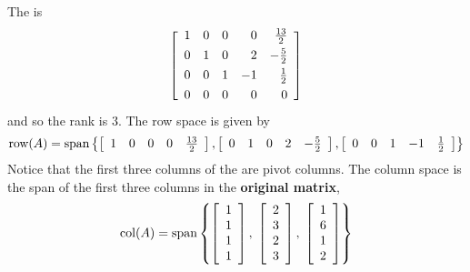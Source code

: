 \begin{solution}
The {\rref} is 
\begin{equation*}
\leftB 
\begin{array}{rrrrrr}
1 & 0 & 0 & 0 & \vspace{0.05in}\frac{13}{2} \\ 
0 & 1 & 0 & 2 & -\vspace{0.05in}\frac{5}{2} \\ 
0 & 0 & 1 & -1 & \vspace{0.05in}\frac{1}{2} \\ 
0 & 0 & 0 & 0 & 0
\end{array}
\rightB 
\end{equation*}
and so the rank is $3$. The row space is given by 
\begin{equation*}
\mbox{row}(A) = \mbox{span} \left\{ 
\left[ 
\begin{array}{ccccc}
1 & 0 & 0 & 0 & \frac{13}{2}
\end{array}
\right],
\left[ 
\begin{array}{rrrrr}
0 & 1 & 0 & 2 & -\frac{5}{2}
\end{array}
\right] , 
\left[ 
\begin{array}{rrrrr}
0 & 0 & 1 & -1 & \frac{1}{2}
\end{array}
\right]
 \right\}
\end{equation*}
Notice that the first three columns of the {\rref} are pivot columns. The column space is the span of the first three columns in the \textbf{original matrix}, 
\begin{equation*}
\mbox{col}(A) = \mbox{span} \left\{ \left[ 
\begin{array}{r}
1 \\ 
1 \\ 
1 \\ 
1
\end{array}
\right], \; \left[ 
\begin{array}{r}
2 \\ 
3 \\ 
2 \\ 
3
\end{array}
\right] , \; \left[ 
\begin{array}{r}
1 \\ 
6 \\ 
1 \\ 
2
\end{array}
\right] \right\}
\end{equation*}

\end{solution}

